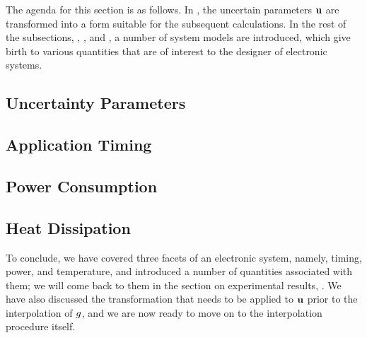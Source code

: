 The agenda for this section is as follows. In , the uncertain
parameters $\mathbf{u}$ are transformed into a form suitable for the subsequent
calculations. In the rest of the subsections, , , and
, a number of system models are introduced, which give birth
to various quantities that are of interest to the designer of electronic
systems.

\subsection{Uncertainty Parameters} 


\subsection{Application Timing} 


\subsection{Power Consumption} 


\subsection{Heat Dissipation} 


To conclude, we have covered three facets of an electronic system, namely,
timing, power, and temperature, and introduced a number of quantities associated
with them; we will come back to them in the section on experimental results,
. We have also discussed the transformation that needs to
be applied to $\mathbf{u}$ prior to the interpolation of $g$, and we are now ready to
move on to the interpolation procedure itself.
